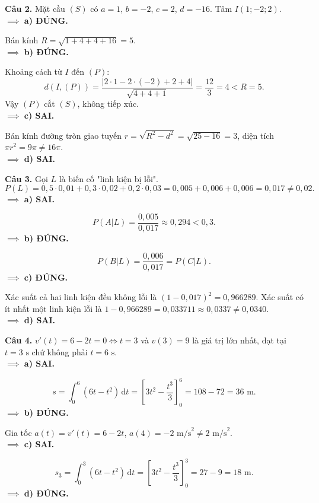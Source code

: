 \documentclass[12pt,a4paper]{article}
\begin{document}
\vspace{0.3cm}
\noindent\textbf{Câu 2.} Mặt cầu $(S)$ có $a = 1$, $b = -2$, $c = 2$, $d = -16$. Tâm $I(1; -2; 2)$.\\
$\implies$ \textbf{a) ĐÚNG.}

Bán kính $R = \sqrt{1 + 4 + 4 + 16} = 5$.\\
$\implies$ \textbf{b) ĐÚNG.}

Khoảng cách từ $I$ đến $(P)$:
\[
d(I, (P)) = \dfrac{|2\cdot 1 - 2\cdot(-2) + 2 + 4|}{\sqrt{4 + 4 + 1}} = \dfrac{12}{3} = 4 < R = 5.
\]
Vậy $(P)$ cắt $(S)$, không tiếp xúc.\\
$\implies$ \textbf{c) SAI.}

Bán kính đường tròn giao tuyến $r = \sqrt{R^2 - d^2} = \sqrt{25 - 16} = 3$, diện tích $\pi r^2 = 9\pi \ne 16\pi$.\\
$\implies$ \textbf{d) SAI.}

\vspace{0.3cm}
\noindent\textbf{Câu 3.} Gọi $L$ là biến cố "linh kiện bị lỗi".
\[
P(L) = 0{,}5\cdot 0{,}01 + 0{,}3\cdot 0{,}02 + 0{,}2\cdot 0{,}03 = 0{,}005 + 0{,}006 + 0{,}006 = 0{,}017 \ne 0{,}02.
\]
$\implies$ \textbf{a) SAI.}

\[
P(A|L) = \dfrac{0{,}005}{0{,}017} \approx 0{,}294 < 0{,}3.
\]
$\implies$ \textbf{b) ĐÚNG.}

\[
P(B|L) = \dfrac{0{,}006}{0{,}017} = P(C|L).
\]
$\implies$ \textbf{c) ĐÚNG.}

Xác suất cả hai linh kiện đều không lỗi là $(1 - 0{,}017)^2 = 0{,}966289$. Xác suất có ít nhất một linh kiện lỗi là $1 - 0{,}966289 = 0{,}033711 \approx 0{,}0337 \ne 0{,}0340$.\\
$\implies$ \textbf{d) SAI.}

\vspace{0.3cm}
\noindent\textbf{Câu 4.} $v'(t) = 6 - 2t = 0 \iff t = 3$ và $v(3) = 9$ là giá trị lớn nhất, đạt tại $t = 3\text{ s}$ chứ không phải $t = 6\text{ s}$.\\
$\implies$ \textbf{a) SAI.}

\[
s = \int_0^6 (6t - t^2)\,\mathrm{d}t = \left[3t^2 - \dfrac{t^3}{3}\right]_0^6 = 108 - 72 = 36\text{ m}.
\]
$\implies$ \textbf{b) ĐÚNG.}

Gia tốc $a(t) = v'(t) = 6 - 2t$, $a(4) = -2\text{ m/s}^2 \ne 2\text{ m/s}^2$.\\
$\implies$ \textbf{c) SAI.}

\[
s_3 = \int_0^3 (6t - t^2)\,\mathrm{d}t = \left[3t^2 - \dfrac{t^3}{3}\right]_0^3 = 27 - 9 = 18\text{ m}.
\]
$\implies$ \textbf{d) ĐÚNG.}
\end{document}
